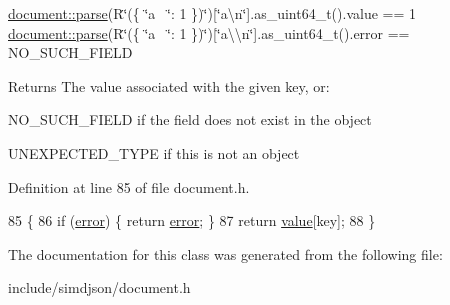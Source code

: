 \hyperlink{classsimdjson_1_1document_a6f11cda7c4a06fffdc00fdc97d98ae2b}{document\+::parse}(R\char`\"{}(\{ \char`\"{}a~\newline
\char`\"{}\+: 1 \})\char`\"{})\mbox{[}\char`\"{}a\textbackslash{}n\char`\"{}\mbox{]}.as\+\_\+uint64\+\_\+t().value == 1 \hyperlink{classsimdjson_1_1document_a6f11cda7c4a06fffdc00fdc97d98ae2b}{document\+::parse}(R\char`\"{}(\{ \char`\"{}a~\newline
\char`\"{}\+: 1 \})\char`\"{})\mbox{[}\char`\"{}a\textbackslash{}\textbackslash{}n\char`\"{}\mbox{]}.as\+\_\+uint64\+\_\+t().error == N\+O\+\_\+\+S\+U\+C\+H\+\_\+\+F\+I\+E\+LD

\begin{DoxyReturn}{Returns}
The value associated with the given key, or\+:
\begin{DoxyItemize}
\item N\+O\+\_\+\+S\+U\+C\+H\+\_\+\+F\+I\+E\+LD if the field does not exist in the object
\item U\+N\+E\+X\+P\+E\+C\+T\+E\+D\+\_\+\+T\+Y\+PE if this is not an object 
\end{DoxyItemize}
\end{DoxyReturn}


Definition at line 85 of file document.\+h.


\begin{DoxyCode}
85                                                                                                            
                           \{
86   \textcolor{keywordflow}{if} (\hyperlink{classsimdjson_1_1document_1_1element__result_3_01document_1_1object_01_4_afb94302f28fe94b4eee922f4803abf86}{error}) \{ \textcolor{keywordflow}{return} \hyperlink{classsimdjson_1_1document_1_1element__result_3_01document_1_1object_01_4_afb94302f28fe94b4eee922f4803abf86}{error}; \}
87   \textcolor{keywordflow}{return} \hyperlink{classsimdjson_1_1document_1_1element__result_3_01document_1_1object_01_4_a65174f23d014d2e7d6ed87f42b60045a}{value}[key];
88 \}
\end{DoxyCode}


The documentation for this class was generated from the following file\+:\begin{DoxyCompactItemize}
\item 
include/simdjson/document.\+h\end{DoxyCompactItemize}
